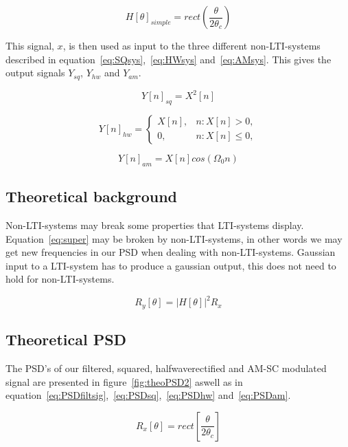 \documentclass[10pt]{article}
\begin{document}
\begin{equation}
  \label{eq:idealH2}
  H[\theta]_{simple} =rect(\frac{\theta} {2\theta_c})
\end{equation}

This signal, $x$, is then used as input to the three different non-LTI-systems
described in equation~\ref{eq:SQsys},~\ref{eq:HWsys} and~\ref{eq:AMsys}.
This gives the output signals $Y_{sq}$, $Y_{hw}$ and $Y_{am}$.

\begin{equation}
  \label{eq:SQsys}
  Y[n]_{sq} =X^2[n]
\end{equation}

\begin{equation}
  \label{eq:HWsys}
  Y[n]_{hw} =
\begin{cases}
   X[n],& n: X[n]>0,\\
    0,    & n: X[n] \leq 0,
\end{cases}
\end{equation}


\begin{equation}
  \label{eq:AMsys}
  Y[n]_{am} =X[n]cos(\Omega_{0}n)
\end{equation}

\subsection{Theoretical background}

Non-LTI-systems may break some properties that LTI-systems display.
Equation~\ref{eq:super} may be broken by non-LTI-systems, in other words we may
get new frequencies in our PSD when dealing with non-LTI-systems.
Gaussian input to a LTI-system has to produce a gaussian output, this does not
need to hold for non-LTI-systems.

\begin{equation}
  \label{eq:super}
  R_y[\theta] =|H[\theta]|^2R_x
\end{equation}


\subsection{Theoretical PSD}
The PSD's of our filtered, squared, halfwaverectified and AM-SC modulated signal
are presented in figure~\ref{fig:theoPSD2} aswell as in equation~\ref{eq:PSDfiltsig},~\ref{eq:PSDsq},~\ref{eq:PSDhw}
and~\ref{eq:PSDam}.

\begin{equation}
  \label{eq:PSDfiltsig}
   R_x[\theta] = rect[\frac{\theta} {2\theta_c}]
\end{equation}
\end{document}

